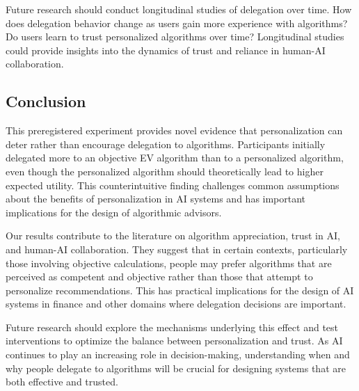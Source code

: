 Future research should conduct longitudinal studies of delegation over time. How does delegation behavior change as users gain more experience with algorithms? Do users learn to trust personalized algorithms over time? Longitudinal studies could provide insights into the dynamics of trust and reliance in human-AI collaboration.

\subsection{Conclusion}

This preregistered experiment provides novel evidence that personalization can deter rather than encourage delegation to algorithms. Participants initially delegated more to an objective EV algorithm than to a personalized algorithm, even though the personalized algorithm should theoretically lead to higher expected utility. This counterintuitive finding challenges common assumptions about the benefits of personalization in AI systems and has important implications for the design of algorithmic advisors.

Our results contribute to the literature on algorithm appreciation, trust in AI, and human-AI collaboration. They suggest that in certain contexts, particularly those involving objective calculations, people may prefer algorithms that are perceived as competent and objective rather than those that attempt to personalize recommendations. This has practical implications for the design of AI systems in finance and other domains where delegation decisions are important.

Future research should explore the mechanisms underlying this effect and test interventions to optimize the balance between personalization and trust. As AI continues to play an increasing role in decision-making, understanding when and why people delegate to algorithms will be crucial for designing systems that are both effective and trusted.